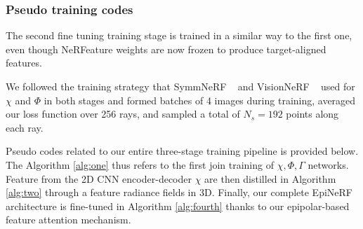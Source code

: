 \subsubsection{Pseudo training codes}
The second fine tuning training stage is trained in a similar way to the first one, even though NeRFeature weights are now frozen to produce target-aligned features. 

We followed the training strategy that SymmNeRF ~\citep{li2022symmnerf} and VisionNeRF ~\citep{lin2023vision} used for $\chi$ and $\Phi$ in both stages and formed batches of 4 images during training, averaged our loss function over 256 rays, and sampled a total of $N_{s}=192$ points along each ray.


Pseudo codes related to our entire three-stage training pipeline is provided below.
The Algorithm \ref{alg:one} thus refers to the first join training of $\chi,\Phi,\Gamma$ networks. Feature from the 2D CNN encoder-decoder $\chi$ are then distilled in Algorithm \ref{alg:two} through a feature radiance fields in 3D. Finally, our complete EpiNeRF architecture is fine-tuned in Algorithm \ref{alg:fourth} thanks to our epipolar-based feature attention mechanism. 

